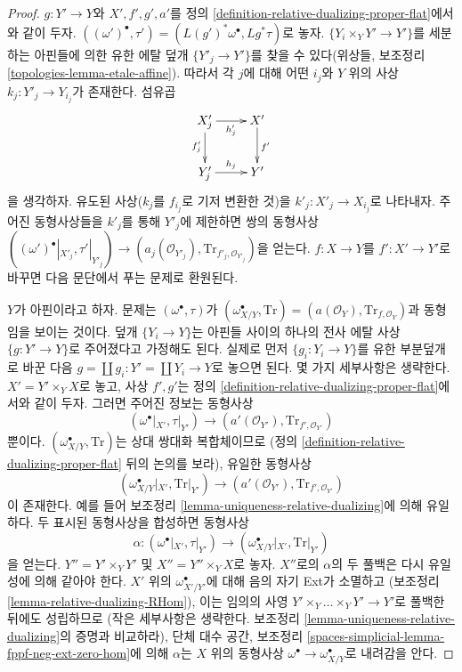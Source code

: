 \begin{proof}
$g : Y' \to Y$와 $X', f', g', a'$를 정의
\ref{definition-relative-dualizing-proper-flat}에서와 같이 두자.
$((\omega')^\bullet, \tau') = (L(g')^*\omega^\bullet, Lg^*\tau)$로
놓자. $\{Y_i \times_Y Y' \to Y'\}$를 세분하는 아핀들에 의한 유한
에탈 덮개 $\{Y'_j \to Y'\}$를 찾을 수 있다(위상들, 보조정리
\ref{topologies-lemma-etale-affine}). 따라서 각 $j$에 대해 어떤
$i_j$와 $Y$ 위의 사상 $k_j : Y'_j \to Y_{i_j}$가 존재한다. 섬유곱
$$
\xymatrix{
X'_j \ar[r]_{h_j'} \ar[d]_{f'_j} &
X' \ar[d]^{f'} \\
Y'_j \ar[r]^{h_j} & Y'
}
$$
을 생각하자. 유도된 사상($k_j$를 $f_{i_j}$로 기저 변환한 것)을
$k'_j : X'_j \to X_{i_j}$로 나타내자. 주어진 동형사상들을 $k'_j$를
통해 $Y'_j$에 제한하면 쌍의 동형사상
$((\omega')^\bullet|_{X'_j}, \tau'|_{Y'_j})
\to (a_j(\mathcal{O}_{Y'_j}), \text{Tr}_{f'_j, \mathcal{O}_{Y'_j}})$을
얻는다. $f : X \to Y$를 $f' : X' \to Y'$로 바꾸면 다음 문단에서
푸는 문제로 환원된다.

\medskip\noindent
$Y$가 아핀이라고 하자. 문제는 $(\omega^\bullet, \tau)$가
$(\omega_{X/Y}^\bullet, \text{Tr}) =
(a(\mathcal{O}_Y), \text{Tr}_{f, \mathcal{O}_Y})$과 동형임을 보이는
것이다. 덮개 $\{Y_i \to Y\}$는 아핀들 사이의 하나의 전사 에탈 사상
$\{g : Y' \to Y\}$로 주어졌다고 가정해도 된다. 실제로 먼저
$\{g_i: Y_i \to Y\}$를 유한 부분덮개로 바꾼 다음
$g = \coprod g_i :  Y' = \coprod Y_i \to Y$로 놓으면 된다. 몇 가지
세부사항은 생략한다. $X' = Y' \times_Y X$로 놓고, 사상 $f', g'$는
정의 \ref{definition-relative-dualizing-proper-flat}에서와 같이 두자.
그러면 주어진 정보는 동형사상
$$
(\omega^\bullet|_{X'}, \tau|_{Y'}) \to
(a'(\mathcal{O}_{Y'}), \text{Tr}_{f', \mathcal{O}_{Y'}})
$$
뿐이다. $(\omega_{X/Y}^\bullet, \text{Tr})$는 상대 쌍대화 복합체이므로
(정의 \ref{definition-relative-dualizing-proper-flat} 뒤의 논의를
보라), 유일한 동형사상
$$
(\omega_{X/Y}^\bullet|_{X'}, \text{Tr}|_{Y'}) \to
(a'(\mathcal{O}_{Y'}), \text{Tr}_{f', \mathcal{O}_{Y'}})
$$
이 존재한다. 예를 들어 보조정리
\ref{lemma-uniqueness-relative-dualizing}에 의해 유일하다. 두 표시된
동형사상을 합성하면 동형사상
$$
\alpha :
(\omega^\bullet|_{X'}, \tau|_{Y'}) \to
(\omega_{X/Y}^\bullet|_{X'}, \text{Tr}|_{Y'})
$$
을 얻는다.
$Y'' = Y' \times_Y Y'$ 및 $X'' = Y'' \times_Y X$로 놓자. $X''$로의
$\alpha$의 두 풀백은 다시 유일성에 의해 같아야 한다.
$X'$ 위의 $\omega_{X'/Y'}^\bullet$에 대해 음의 자기 Ext가 소멸하고
(보조정리 \ref{lemma-relative-dualizing-RHom}), 이는 임의의 사영
$Y' \times_Y \ldots \times_Y Y' \to Y'$로 풀백한 뒤에도 성립하므로
(작은 세부사항은 생략한다. 보조정리
\ref{lemma-uniqueness-relative-dualizing}의 증명과 비교하라), 단체 대수
공간, 보조정리 \ref{spaces-simplicial-lemma-fppf-neg-ext-zero-hom}에
의해 $\alpha$는 $X$ 위의 동형사상
$\omega^\bullet \to \omega_{X/Y}^\bullet$로 내려감을 안다.
\end{proof}

